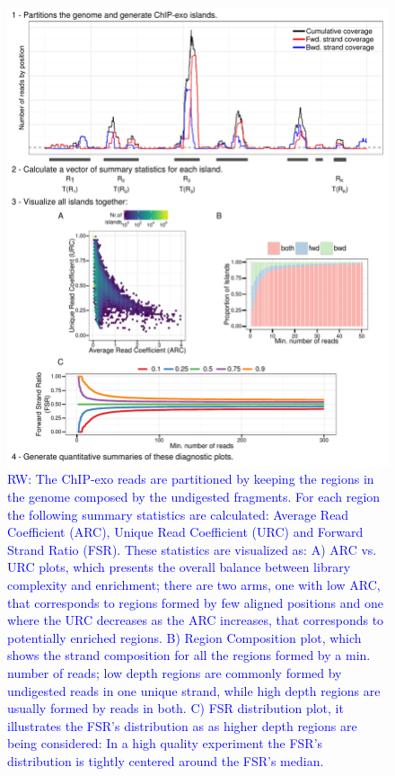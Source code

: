 \documentclass{bmcart}
\newcommand{\RW}[1]{\textcolor{blue}{RW: #1}}
\begin{document}
\begin{figure}[h!]
  \centering
  \includegraphics[width = .95\textwidth]{figures/fig2/fig2.pdf}
  \caption{\RW{The ChIP-exo reads are partitioned by keeping the
      regions in the genome composed by the undigested fragments. For
      each region the following summary statistics are calculated:
      Average Read Coefficient (ARC), Unique Read Coefficient (URC)
      and Forward Strand Ratio (FSR). These statistics are visualized
      as: A) ARC vs. URC plots, which presents the overall balance
      between library complexity and enrichment; there are two arms,
      one with low ARC, that corresponds to regions formed by few
      aligned positions and one where the URC decreases as the ARC
      increases, that corresponds to potentially enriched regions. B)
      Region Composition plot, which shows the strand composition for
      all the regions formed by a min. number of reads; low depth
      regions are commonly formed by undigested reads in one unique
      strand, while high depth regions are usually formed by reads in
      both. C) FSR distribution plot, it illustrates the FSR's
      distribution as as higher depth regions are being considered: In
      a high quality experiment the FSR's distribution is tightly
      centered around the FSR's median.}}



  \label{fig:2}
\end{figure}
\end{document}
